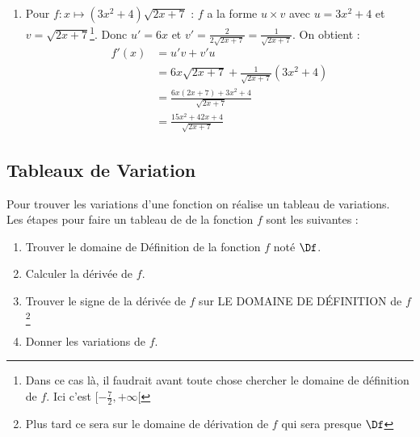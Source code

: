 \documentclass[12pt,fleqn]{report} %
\begin{document}
\begin{example}
\begin{enumerate}
		\item Pour $f : x \mapsto (3x^2  + 4) \sqrt{2x + 7}$ : $f$ a la forme $u\times v$ avec $ u= 3x^2 + 4$ et $v = \sqrt{2x + 7}$\footnote{Dans ce cas là, il faudrait avant toute chose chercher le domaine de définition de $f$. Ici c'est $[-\frac{7}{2}, +\infty[$}. Donc $u' = 6x$ et $v' = \frac{2}{2\sqrt{2x + 7}} = \frac{1}{\sqrt{2x + 7}}$. On obtient : 
		\begin{align*}
		f'(x) & = u' v + v'u \\ 
		& = 6x \sqrt{2x+7} + \frac{1}{\sqrt{2x + 7}}(3x^2 + 4) \\  
		& = \frac{6x(2x + 7) + 3x^2 + 4}{\sqrt{2x + 7}} \\
		& = \frac{15 x^2 + 42 x + 4}{\sqrt{2x + 7}}
		\end{align*}
	\end{enumerate}
\end{example}


\subsection{Tableaux de Variation}
Pour trouver les variations d'une fonction on réalise un tableau de variations. \\Les étapes pour faire un tableau de  de la fonction $f$ sont les suivantes : 


\begin{enumerate}
	\item Trouver le domaine de Définition de la fonction $f$ noté $\Df$.
	\item Calculer la dérivée de $f$.
	\item Trouver le signe de la dérivée de $f$ sur LE DOMAINE DE D\'EFINITION de $f$ \footnote{Plus tard ce sera sur le domaine de dérivation de $f$ qui sera presque $\Df$}
	\item Donner les variations de $f$.
\end{enumerate}
\end{document}
